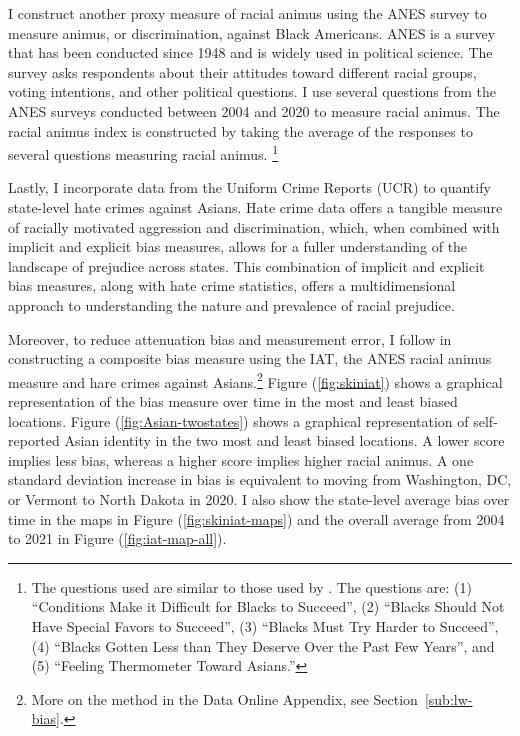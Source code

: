 I construct another proxy measure of racial animus using the ANES survey \textcite{anes2021} to measure animus, or discrimination, against Black Americans. ANES is a survey that has been conducted since 1948 and is widely used in political science. The survey asks respondents about their attitudes toward different racial groups, voting intentions, and other political questions. I use several questions from the ANES surveys conducted between 2004 and 2020 to measure racial animus. The racial animus index is constructed by taking the average of the responses to several questions measuring racial animus. \footnote{The questions used are similar to those used by \textcite{charlesPrejudiceWagesEmpirical2008}. The questions are: (1) ``Conditions Make it Difficult for Blacks to Succeed'', (2) ``Blacks Should Not Have Special Favors to Succeed'', (3) ``Blacks Must Try Harder to Succeed'', (4) ``Blacks Gotten Less than They Deserve Over the Past Few Years'', and (5) ``Feeling Thermometer Toward Asians.''}

Lastly, I incorporate data from the Uniform Crime Reports (UCR) \autocite{ucrbook} to quantify state-level hate crimes against Asians. Hate crime data offers a tangible measure of racially motivated aggression and discrimination, which, when combined with implicit and explicit bias measures, allows for a fuller understanding of the landscape of prejudice across states. This combination of implicit and explicit bias measures, along with hate crime statistics, offers a multidimensional approach to understanding the nature and prevalence of racial prejudice.

Moreover, to reduce attenuation bias and measurement error, I follow \textcite{lubotskyInterpretationRegressionsMultiple2006} in constructing a composite bias measure using  the IAT, the ANES racial animus measure and hare crimes against Asians.\footnote{More on the method in the Data Online Appendix, see Section~\ref{sub:lw-bias}.} Figure (\ref{fig:skiniat}) shows a graphical representation of the bias measure over time in the most and least biased locations. Figure (\ref{fig:Asian-twostates}) shows a graphical representation of self-reported Asian identity in the two most and least biased locations. A lower score implies less bias, whereas a higher score implies higher racial animus. A one standard deviation increase in bias is equivalent to moving from Washington, DC, or Vermont to North Dakota in 2020. I also show the state-level average bias over time in the maps in Figure (\ref{fig:skiniat-maps}) and the overall average from 2004 to 2021 in Figure (\ref{fig:iat-map-all}).
